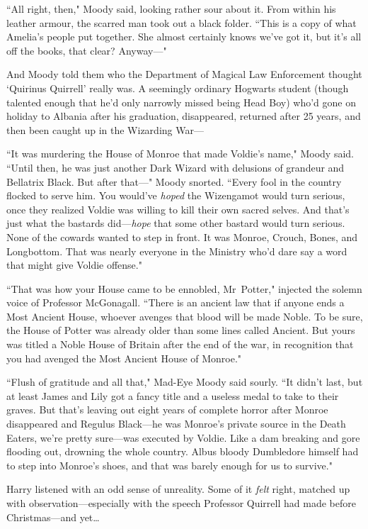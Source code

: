 ``All right, then," Moody said, looking rather sour about it. From within his leather armour, the scarred man took out a black folder. ``This is a copy of what Amelia's people put together. She almost certainly knows we've got it, but it's all off the books, that clear? Anyway—"

And Moody told them who the Department of Magical Law Enforcement thought `Quirinus Quirrell' really was. A seemingly ordinary Hogwarts student (though talented enough that he'd only narrowly missed being Head Boy) who'd gone on holiday to Albania after his graduation, disappeared, returned after 25 years, and then been caught up in the Wizarding War—

``It was murdering the House of Monroe that made Voldie's name," Moody said. ``Until then, he was just another Dark Wizard with delusions of grandeur and Bellatrix Black. But after that—" Moody snorted. ``Every fool in the country flocked to serve him. You would've \emph{hoped} the Wizengamot would turn serious, once they realized Voldie was willing to kill their own sacred selves. And that's just what the bastards did—\emph{hope} that some other bastard would turn serious. None of the cowards wanted to step in front. It was Monroe, Crouch, Bones, and Longbottom. That was nearly everyone in the Ministry who'd dare say a word that might give Voldie offense."

``That was how your House came to be ennobled, Mr~Potter," injected the solemn voice of Professor McGonagall. ``There is an ancient law that if anyone ends a Most Ancient House, whoever avenges that blood will be made Noble. To be sure, the House of Potter was already older than some lines called Ancient. But yours was titled a Noble House of Britain after the end of the war, in recognition that you had avenged the Most Ancient House of Monroe."

``Flush of gratitude and all that," Mad-Eye Moody said sourly. ``It didn't last, but at least James and Lily got a fancy title and a useless medal to take to their graves. But that's leaving out eight years of complete horror after Monroe disappeared and Regulus Black—he was Monroe's private source in the Death Eaters, we're pretty sure—was executed by Voldie. Like a dam breaking and gore flooding out, drowning the whole country. Albus bloody Dumbledore himself had to step into Monroe's shoes, and that was barely enough for us to survive."

Harry listened with an odd sense of unreality. Some of it \emph{felt} right, matched up with observation—especially with the speech Professor Quirrell had made before Christmas—and yet{\ldots}

